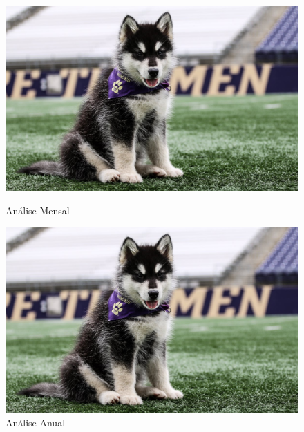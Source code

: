 \documentclass{article}
\begin{document}
\begin{figure}[H]
    \centering
    \begin{minipage}{0.45\textwidth}
        \centering
        \includegraphics[width=\textwidth]{dubs.jpg}
        \caption{Análise Mensal}
        \label{fig:casos-30-dias}
    \end{minipage}
    \hfill
    \begin{minipage}{0.45\textwidth}
        \centering
        \includegraphics[width=\textwidth]{dubs.jpg}
        \caption{Análise Anual}
        \label{fig:casos-12-meses}
    \end{minipage}
\end{figure}
\end{document}
